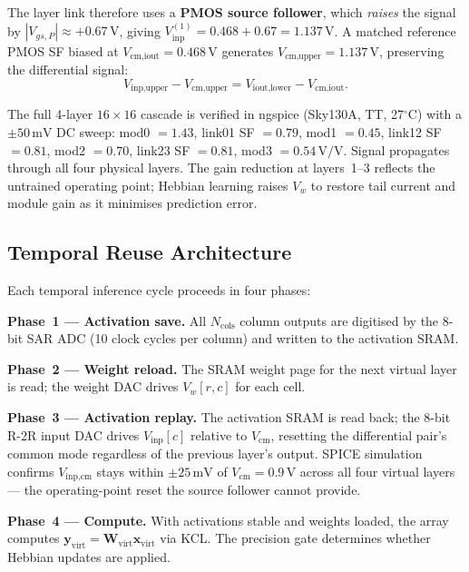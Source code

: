 \documentclass[journal,10pt,twoside]{IEEEtran}
\begin{document}
The layer link therefore uses a \textbf{PMOS source follower}, which
\emph{raises} the signal by $|V_{gs,P}| \approx +0.67\,\text{V}$,
giving $V_\text{inp}^{(1)} = 0.468 + 0.67 = 1.137\,\text{V}$.
A matched reference PMOS SF biased at $V_\text{cm,iout} = 0.468\,\text{V}$
generates $V_\text{cm,upper} = 1.137\,\text{V}$, preserving the
differential signal:
\begin{equation}
  V_\text{inp,upper} - V_\text{cm,upper} = V_\text{iout,lower} - V_\text{cm,iout}.
\end{equation}

The full 4-layer $16{\times}16$ cascade is verified in ngspice
(Sky130A, TT, 27$^\circ$C) with a $\pm50\,\text{mV}$ DC sweep:
mod0 $= 1.43$, link01 SF $= 0.79$, mod1 $= 0.45$, link12 SF $= 0.81$,
mod2 $= 0.70$, link23 SF $= 0.81$, mod3 $= 0.54\,\text{V/V}$.
Signal propagates through all four physical layers.
The gain reduction at layers~1--3 reflects the untrained operating point;
Hebbian learning raises $V_w$ to restore tail current and module gain
as it minimises prediction error.

\subsection{Temporal Reuse Architecture}

Each temporal inference cycle proceeds in four phases:

\textbf{Phase~1 — Activation save.}
All $N_\text{cols}$ column outputs are digitised by the 8-bit SAR ADC
(10 clock cycles per column) and written to the activation SRAM.

\textbf{Phase~2 — Weight reload.}
The SRAM weight page for the next virtual layer is read; the weight DAC
drives $V_w[r,c]$ for each cell.

\textbf{Phase~3 — Activation replay.}
The activation SRAM is read back; the 8-bit R-2R input DAC drives
$V_\text{inp}[c]$ relative to $V_\text{cm}$, resetting the differential
pair's common mode regardless of the previous layer's output.
SPICE simulation confirms $V_\text{inp,cm}$ stays within
$\pm 25\,\text{mV}$ of $V_\text{cm} = 0.9\,\text{V}$ across all four
virtual layers — the operating-point reset the source follower cannot provide.

\textbf{Phase~4 — Compute.}
With activations stable and weights loaded, the array computes
$\mathbf{y}_\text{virt} = \mathbf{W}_\text{virt}\mathbf{x}_\text{virt}$
via KCL.
The precision gate determines whether Hebbian updates are applied.
\end{document}
